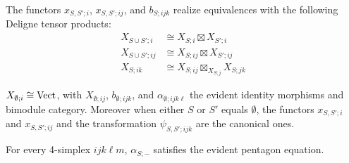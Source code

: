 \documentclass{amsart}
\begin{document}
\begin{list}{(TCO)}{}
	\item  The functors $x_{S,S';i}$, $x_{S,S'; ij}$, and $b_{S;ijk}$ realize equivalences with the following Deligne tensor products:
	\begin{align*}
		X_{S \cup S'; i} &\cong X_{S; i} \boxtimes X_{S';i} \\ 
		X_{S \cup S'; ij} &\cong X_{S; ij} \boxtimes X_{S';ij} \\ 
		X_{S; ik} & \cong X_{S;ij} \boxtimes_{X_{S;j}} X_{S;jk}
	\end{align*}
	\item  $X_{\emptyset; i} \cong \mathrm{Vect}$, with $X_{\emptyset; ij}$, $b_{\emptyset; ijk}$, and $\alpha_{\emptyset; ijk\ell}$ the evident identity morphisms and bimodule category. Moreover when either $S$ or $S'$ equals $\emptyset$, the functors $x_{S,S'; i}$ and $x_{S, S'; ij}$ and the transformation $\psi_{S,S'; ijk}$ are the canonical ones.  
	\item  For every 4-simplex $ijk\ell m$, $\alpha_{S; -}$ satisfies the evident pentagon equation.


\end{list}
\end{document}
